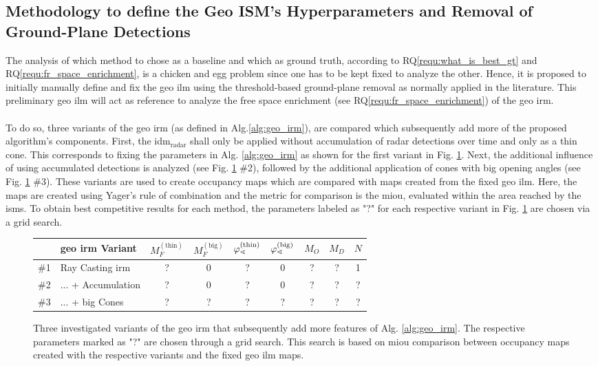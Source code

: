 \subsection{Methodology to define the Geo ISM's Hyperparameters and Removal of Ground-Plane Detections}
\label{subsec:method_choice_of_gt}
The analysis of which method to chose as a baseline and which as ground truth, according to RQ\ref{requ:what_is_best_gt} and RQ\ref{requ:fr_space_enrichment}, is a chicken and egg problem since one has to be kept fixed to analyze the other. Hence, it is proposed to initially manually define and fix the geo \gls{ilm} using the threshold-based ground-plane removal as normally applied in the literature. This preliminary geo \gls{ilm} will act as reference to analyze the free space enrichment (see RQ\ref{requ:fr_space_enrichment}) of the geo \gls{irm}. 
\\\\
To do so, three variants of the geo \gls{irm} (as defined in Alg.\ref{alg:geo_irm}), are compared which subsequently add more of the proposed algorithm's components. First, the \gls{idm}$_\text{radar}$ shall only be applied without accumulation of radar detections over time and only as a thin cone. This corresponds to fixing the parameters in Alg. \ref{alg:geo_irm} as shown for the first variant in Fig. \ref{tab:geo_irm_variants}. Next, the additional influence of using accumulated detections is analyzed (see Fig. \ref{tab:geo_irm_variants} \#2), followed by the additional application of cones with big opening angles (see Fig. \ref{tab:geo_irm_variants} \#3). These variants are used to create occupancy maps which are compared with maps created from the fixed geo \gls{ilm}. Here, the maps are created using Yager's rule of combination and the metric for comparison is the m\gls{iou}, evaluated within the area reached by the \gls{ism}s. To obtain best competitive results for each method, the parameters labeled as "?" for each respective variant in Fig. \ref{tab:geo_irm_variants} are chosen via a grid search. 
\begin{figure}
\begin{center}
	\begin{tabular}{cl|c|c|c|c|c|c|c}
		& geo \gls{irm} Variant & $M_F^{(\text{thin})}$ & $M_F^{(\text{big})}$ & $\varphi_\sphericalangle^{(\text{\scriptsize thin})}$ & $\varphi_\sphericalangle^{(\text{\scriptsize big})}$ & $M_O$ & $M_D$ & $N$ \\
		\hline
		\#1 &Ray Casting \gls{irm}& ? & \textcolor{myred}{0} & ? & \textcolor{myred}{0} & ? & ? & \textcolor{myred}{1} \\
		\#2 &... + Accumulation & ? & \textcolor{myred}{0} & ? & \textcolor{myred}{0} & ? & ? & ? \\
		\#3 &... + big Cones & ? & ? & ? & ? & ? & ? & ?
	\end{tabular}
\end{center}
\caption{\label{tab:geo_irm_variants}Three investigated variants of the geo \gls{irm} that subsequently add more features of Alg. \ref{alg:geo_irm}. The respective parameters marked as "?" are chosen through a grid search. This search is based on m\gls{iou} comparison between occupancy maps created with the respective variants and the fixed geo \gls{ilm} maps.}
\end{figure} 
